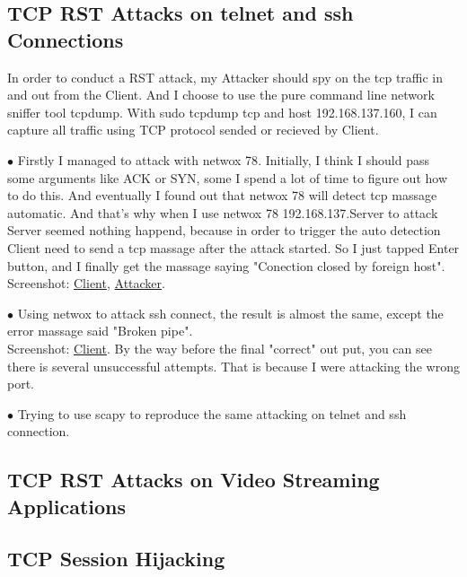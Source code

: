 \documentclass{article}
\newcommand{\code}[1]{{\ttfamily #1}}
\begin{document}
\subsection{TCP RST Attacks on {\ttfamily telnet} and {\ttfamily ssh} Connections}
In order to conduct a RST attack, my Attacker should spy on the tcp traffic in and out from the Client. And I choose to use the pure command line network sniffer tool \code{tcpdump}.
With \code{sudo tcpdump tcp and host 192.168.137.160}, I can capture all traffic using TCP protocol sended or recieved by Client.
\begin{tlist}{3}
  \item[$\bullet$]
  Firstly I managed to attack with \code{netwox 78}. Initially, I think I should pass some arguments like \code{ACK} or \code{SYN}, some I spend a lot of time to figure out how to do this. And eventually I found out that \code{netwox 78} will detect tcp massage automatic. And that's why when I use \code{netwox 78 192.168.137.Server} to attack Server seemed nothing happend, because in order to trigger the auto detection Client need to send a tcp massage after the attack started. So I just tapped Enter button, and I finally get the massage saying \code{"Conection closed by foreign host"}.\\
  Screenshot:
  \href{https://i.loli.net/2018/09/11/5b9751105d0b4.png}{Client},
  \href{https://i.loli.net/2018/09/11/5b9751105e414.png}{Attacker}.
  \item[$\bullet$]
  Using \code{netwox} to attack ssh connect, the result is almost the same, except the error massage said \code{"Broken pipe"}.\\
  Screenshot:
  \href{https://i.loli.net/2018/09/11/5b97536e44d80.png}{Client}.
  By the way before the final "correct" out put, you can see there is several unsuccessful attempts. That is because I were attacking the wrong port.
  \item[$\bullet$]
  Trying to use scapy to reproduce the same attacking on telnet and ssh connection.
\end{tlist}

\subsection{TCP RST Attacks on Video Streaming Applications}
\subsection{TCP Session Hijacking}
\end{document}

